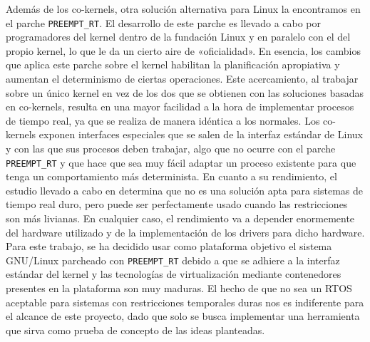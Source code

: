 Además de los co-kernels, otra solución alternativa para Linux la encontramos en
el parche \texttt{PREEMPT\_RT}. El desarrollo de este parche es llevado a cabo
por programadores del kernel dentro de la fundación Linux y en paralelo con el
del propio kernel, lo que le da un cierto aire de «oficialidad». En esencia, los
cambios que aplica este parche sobre el kernel habilitan la planificación
apropiativa y aumentan el determinismo de ciertas operaciones. Este
acercamiento, al trabajar sobre un único kernel en vez de los dos que se
obtienen con las soluciones basadas en co-kernels, resulta en una mayor
facilidad a la hora de implementar procesos de tiempo real, ya que se realiza de
manera idéntica a los normales. Los co-kernels exponen interfaces especiales que
se salen de la interfaz estándar de Linux y con las que sus procesos deben
trabajar, algo que no ocurre con el parche \texttt{PREEMPT\_RT} y que hace que
sea muy fácil adaptar un proceso existente para que tenga un comportamiento más
determinista. En cuanto a su rendimiento, el estudio llevado a cabo en
\cite{reghenzani_real-time_2019} determina que no es una solución apta para
sistemas de tiempo real duro, pero puede ser perfectamente usado cuando las
restricciones son más livianas. En cualquier caso, el rendimiento va a depender
enormemente del hardware utilizado y de la implementación de los drivers para
dicho hardware. Para este trabajo, se ha decidido usar como plataforma objetivo
el sistema GNU/Linux parcheado con \texttt{PREEMPT\_RT} debido a que se adhiere
a la interfaz estándar del kernel y las tecnologías de virtualización mediante
contenedores presentes en la plataforma son muy maduras. El hecho de que no sea
un RTOS aceptable para sistemas con restricciones temporales duras nos es
indiferente para el alcance de este proyecto, dado que solo se busca implementar
una herramienta que sirva como prueba de concepto de las ideas planteadas.